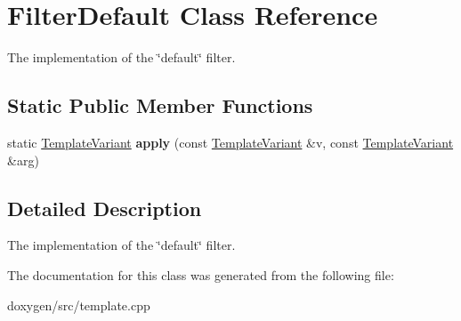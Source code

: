 \hypertarget{class_filter_default}{}\section{Filter\+Default Class Reference}
\label{class_filter_default}


The implementation of the \char`\"{}default\char`\"{} filter.  


\subsection*{Static Public Member Functions}
\begin{DoxyCompactItemize}
\item 
\mbox{\label{class_filter_default_a573c5be35e8381ca8dd6287976cbd16a}} 
static \mbox{\hyperlink{class_template_variant}{Template\+Variant}} {\bfseries apply} (const \mbox{\hyperlink{class_template_variant}{Template\+Variant}} \&v, const \mbox{\hyperlink{class_template_variant}{Template\+Variant}} \&arg)
\end{DoxyCompactItemize}


\subsection{Detailed Description}
The implementation of the \char`\"{}default\char`\"{} filter. 

The documentation for this class was generated from the following file\+:\begin{DoxyCompactItemize}
\item 
doxygen/src/template.\+cpp\end{DoxyCompactItemize}
